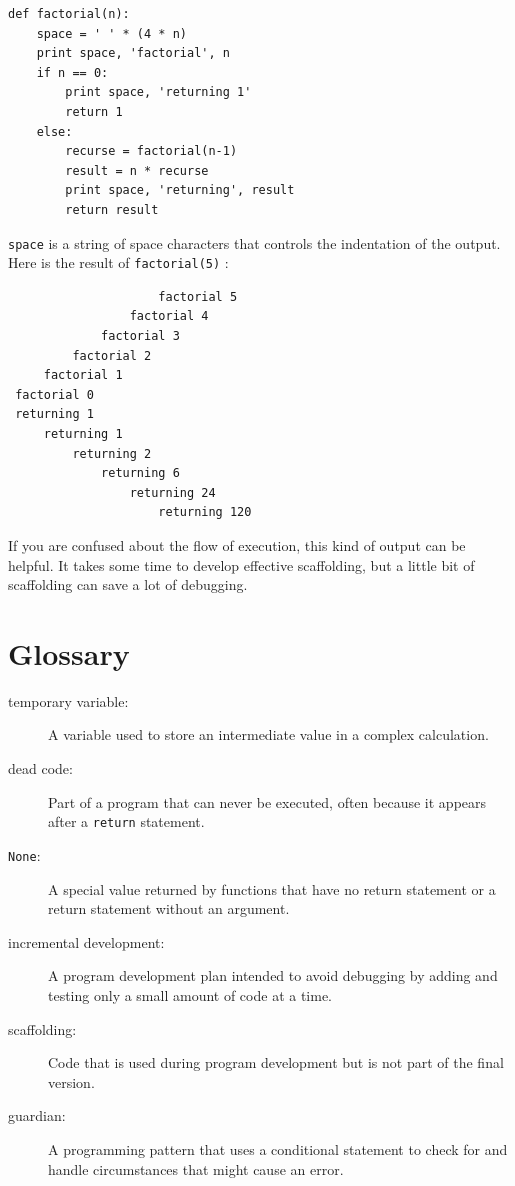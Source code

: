 \documentclass[10pt]{book}
\begin{document}
\begin{verbatim}
def factorial(n):
    space = ' ' * (4 * n)
    print space, 'factorial', n
    if n == 0:
        print space, 'returning 1'
        return 1
    else:
        recurse = factorial(n-1)
        result = n * recurse
        print space, 'returning', result
        return result
\end{verbatim}
%
{\tt space} is a string of space characters that controls the
indentation of the output.  Here is the result of {\tt factorial(5)} :

\begin{verbatim}
                     factorial 5
                 factorial 4
             factorial 3
         factorial 2
     factorial 1
 factorial 0
 returning 1
     returning 1
         returning 2
             returning 6
                 returning 24
                     returning 120
\end{verbatim}
%
If you are confused about the flow of execution, this kind of
output can be helpful.  It takes some time to develop effective
scaffolding, but a little bit of scaffolding can save a lot of debugging.


\section{Glossary}

\begin{description}

\item[temporary variable:]  A variable used to store an intermediate value in
a complex calculation.

\item[dead code:]  Part of a program that can never be executed, often because
it appears after a {\tt return} statement.

\item[{\tt None}:]  A special value returned by functions that
have no return statement or a return statement without an argument.

\item[incremental development:]  A program development plan intended to
avoid debugging by adding and testing only
a small amount of code at a time.

\item[scaffolding:]  Code that is used during program development but is
not part of the final version.

\item[guardian:]  A programming pattern that uses a conditional
statement to check for and handle circumstances that
might cause an error.

\end{description}
\end{document}

